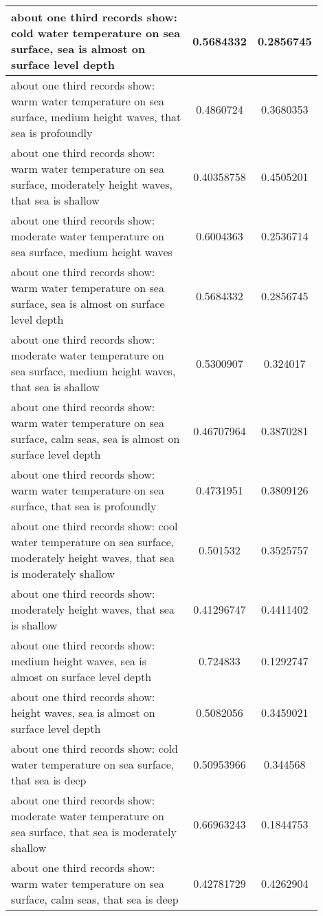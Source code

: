 \documentclass{article}
\begin{document}
\begin{longtable}{|p{0.9\linewidth}|c|c|}
about one third records show: cold water temperature on sea surface, sea is almost on surface level depth & 0.5684332 & 0.2856745 \\ \hline
about one third records show: warm water temperature on sea surface, medium height waves, that sea is profoundly & 0.4860724 & 0.3680353 \\ \hline
about one third records show: warm water temperature on sea surface, moderately height waves, that sea is shallow & 0.40358758 & 0.4505201 \\ \hline
about one third records show: moderate water temperature on sea surface, medium height waves & 0.6004363 & 0.2536714 \\ \hline
about one third records show: warm water temperature on sea surface, sea is almost on surface level depth & 0.5684332 & 0.2856745 \\ \hline
about one third records show: moderate water temperature on sea surface, medium height waves, that sea is shallow & 0.5300907 & 0.324017 \\ \hline
about one third records show: warm water temperature on sea surface, calm seas, sea is almost on surface level depth & 0.46707964 & 0.3870281 \\ \hline
about one third records show: warm water temperature on sea surface, that sea is profoundly & 0.4731951 & 0.3809126 \\ \hline
about one third records show: cool water temperature on sea surface, moderately height waves, that sea is moderately shallow & 0.501532 & 0.3525757 \\ \hline
about one third records show: moderately height waves, that sea is shallow & 0.41296747 & 0.4411402 \\ \hline
about one third records show: medium height waves, sea is almost on surface level depth & 0.724833 & 0.1292747 \\ \hline
about one third records show: height waves, sea is almost on surface level depth & 0.5082056 & 0.3459021 \\ \hline
about one third records show: cold water temperature on sea surface, that sea is deep & 0.50953966 & 0.344568 \\ \hline
about one third records show: moderate water temperature on sea surface, that sea is moderately shallow & 0.66963243 & 0.1844753 \\ \hline
about one third records show: warm water temperature on sea surface, calm seas, that sea is deep & 0.42781729 & 0.4262904 \\ \hline

\end{longtable}
\end{document}
